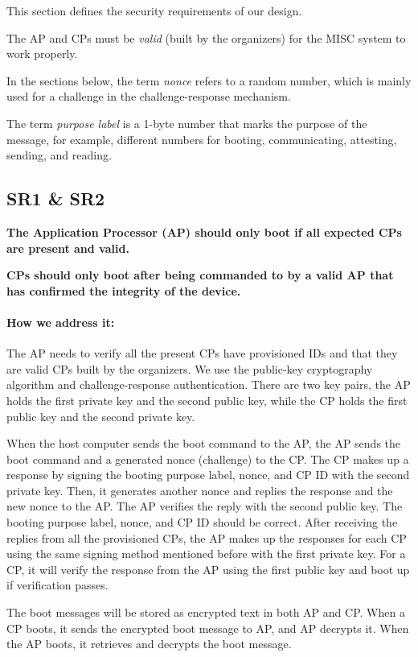 \documentclass[11pt,oneside,onecolumn,letterpaper]{article}
\newcounter{alg}
\begin{document}
	This section defines the security requirements of our design.
	
	The AP and CPs must be \textit{valid} (built by the organizers) for the MISC system to work properly.
	
	In the sections below,
	the term \textit{nonce} refers to a random number,
	which is mainly used for a challenge in the challenge-response mechanism.
	
	The term \textit{purpose label} is a 1-byte number that marks the purpose of the message,
	for example,
	different numbers for booting,
	communicating,
	attesting,
	sending,
	and reading.
	
	\subsection{SR1 \& SR2}
	\textbf{The Application Processor (AP) should only boot if all expected CPs are present and valid.}
	
	\textbf{CPs should only boot after being commanded to by a valid AP that has confirmed the integrity of the device.}
	
	\paragraph{How we address it:}
	The AP needs to verify all the present CPs have provisioned IDs and that they are valid CPs built by the organizers.
	We use the public-key cryptography algorithm and challenge-response authentication.
	There are two key pairs,
	the AP holds the first private key and the second public key,
	while the CP holds the first public key and the second private key.
	
	When the host computer sends the boot command to the AP,
	the AP sends the boot command and a generated nonce (challenge) to the CP.
	The CP makes up a response by signing the booting purpose label,
	nonce,
	and CP ID with the second private key.
	Then,
	it generates another nonce and replies the response and the new nonce to the AP.
	The AP verifies the reply with the second public key.
	The booting purpose label,
	nonce,
	and CP ID should be correct.
	After receiving the replies from all the provisioned CPs,
	the AP makes up the responses for each CP using the same signing method mentioned before with the first private key.
	For a CP,
	it will verify the response from the AP using the first public key and boot up if verification passes.
	
	The boot messages will be stored as encrypted text in both AP and CP.
	When a CP boots,
	it sends the encrypted boot message to AP,
	and AP decrypts it.
	When the AP boots,
	it retrieves and decrypts the boot message.
	
\end{document}
